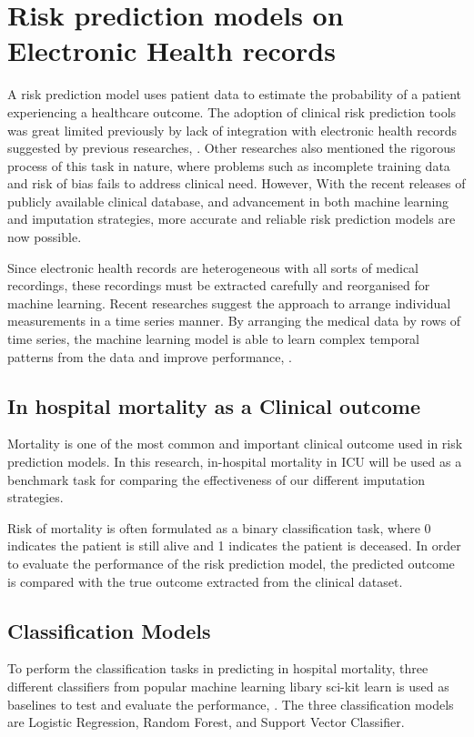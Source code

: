 \documentclass{l4proj}
\begin{document}
\section{Risk prediction models on Electronic Health records}

A risk prediction model uses patient data to estimate the probability of a patient experiencing a healthcare outcome. The adoption of clinical risk prediction tools was great limited previously by lack of integration with electronic health records suggested by previous researches, \cite{Sharmae100253}. Other researches also mentioned the rigorous process of this task in nature, where problems such as incomplete training data and risk of bias fails to address clinical need. However, With the recent releases of publicly available clinical database, and advancement in both machine learning and imputation strategies, more accurate and reliable risk prediction models are now possible.

Since electronic health records are heterogeneous with all sorts of medical recordings, these recordings must be extracted carefully and reorganised for machine learning. Recent researches suggest the approach to arrange individual measurements in a time series manner. By arranging the medical data by rows of time series, the machine learning model is able to learn complex temporal patterns from the data and improve performance, \cite{Harutyunyan2019}. 

\subsection{In hospital mortality as a Clinical outcome}

Mortality is one of the most common and important clinical outcome used in risk prediction models. In this research, in-hospital mortality in ICU will be used as a benchmark task for comparing the effectiveness of our different imputation strategies. 

Risk of mortality is often formulated as a binary classification task, where 0 indicates the patient is still alive and 1 indicates the patient is deceased. In order to evaluate the performance of the risk prediction model, the predicted outcome is compared with the true outcome extracted from the clinical dataset. 

\subsection{Classification Models}
To perform the classification tasks in predicting in hospital mortality, three different classifiers from popular machine learning libary sci-kit learn is used as baselines to test and evaluate the performance, \cite{scikit-learn}. The three classification models are Logistic Regression, Random Forest, and Support Vector Classifier.
\end{document}
